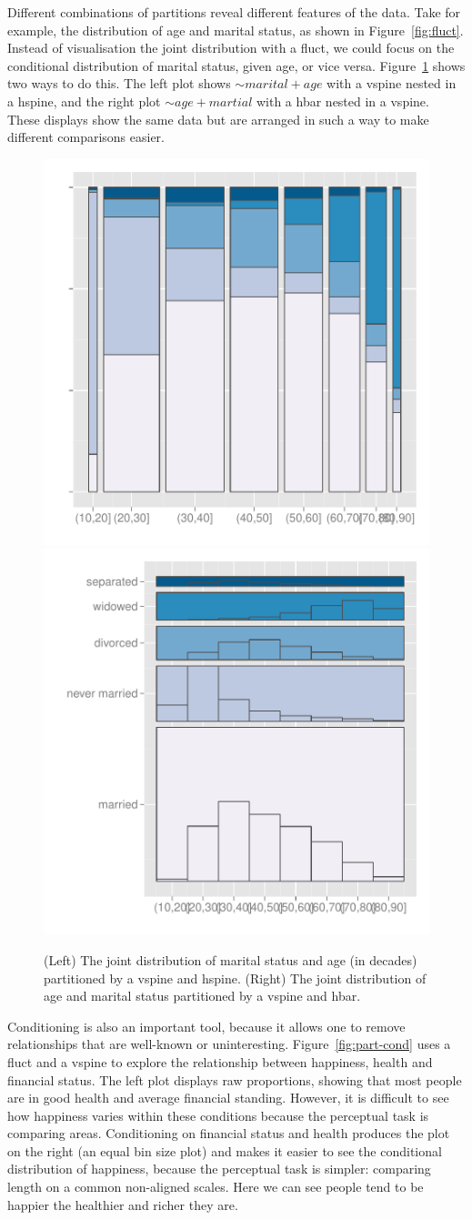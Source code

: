 \documentclass[letterpaper,oneside]{scrartcl}
\begin{document}
Different combinations of partitions reveal different features of the data. Take for example, the distribution of age and marital status, as shown in Figure~\ref{fig:fluct}. Instead of visualisation the joint distribution with a fluct, we could focus on the conditional distribution of marital status, given age, or vice versa. Figure~\ref{fig:marital} shows two ways to do this. The left plot shows $\sim marital + age$ with a vspine nested in a hspine, and the right plot $\sim age + martial$ with a hbar nested in a vspine. These displays show the same data but are arranged in such a way to make different comparisons easier.

\begin{figure}[htbp]
  \centering
    \includegraphics[width=0.5\linewidth]{part-marital-1}%
    \includegraphics[width=0.5\linewidth]{part-marital-2}
  \caption{(Left) The joint distribution of marital status and age (in decades) partitioned by a vspine and hspine.  (Right) The joint distribution of age and marital status partitioned by a vspine and hbar.}
  \label{fig:marital}
\end{figure}

Conditioning is also an important tool, because it allows one to remove relationships that are well-known or uninteresting. Figure~\ref{fig:part-cond} uses a fluct and a vspine to explore the relationship between happiness, health and financial status. The left plot displays raw proportions, showing that most people are in good health and average financial standing. However, it is difficult to see how happiness varies within these conditions because the perceptual task is comparing areas. Conditioning on financial status and health produces the plot on the right (an equal bin size plot) and makes it easier to see the conditional distribution of happiness, because the perceptual task is simpler: comparing length on a common non-aligned scales.  Here we can see people tend to be happier the healthier and richer they are.
\end{document}

